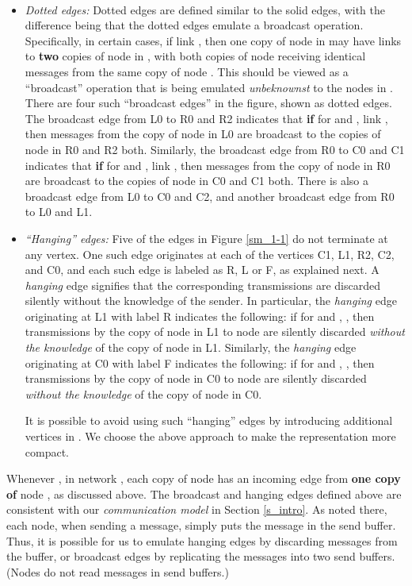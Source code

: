 \documentclass[letterpaper, 11pt]{article}
\newenvironment{proof}{\noindent {\bf Proof:}~}{\hspace*{\fill}}
\begin{document}
\begin{proof}
\begin{itemize}
\item {\em Dotted edges:}
Dotted edges are defined similar to the solid edges, with the difference being that
the dotted edges emulate a broadcast operation. 
Specifically, in certain cases, if link , then one copy of node 
in  may have links to {\bf two} copies of node  in , with both copies
of node  receiving identical messages from the same copy of node . 
This should be viewed as a ``broadcast'' operation that is being
emulated {\em unbeknownst} to the
nodes in .
There are four such ``broadcast edges'' in the figure, shown as
dotted edges.
The broadcast edge from L0 to R0 and R2 indicates that
{\bf if} for  and , link ,
then messages from the copy of node  in L0 are broadcast to the
copies of node  in R0 and R2 both.
Similarly, the broadcast edge from R0 to C0 and C1 indicates that
{\bf if} for  and , link ,
then messages from the copy of node  in R0 are broadcast to the
copies of node  in C0 and C1 both.
There is also a broadcast edge from L0 to C0 and C2,
and another broadcast edge from R0 to L0 and L1. 

\item {\em ``Hanging'' edges:}
Five of the edges in Figure \ref{sm_1-1} do not terminate at any vertex.
One such edge originates at each of the vertices C1, L1, R2, C2, and C0,
and each such edge is labeled as R, L or F, as explained next.
A {\em hanging} edge signifies that the corresponding transmissions are discarded
silently without the knowledge of the sender.
In particular, the {\em hanging} edge originating at L1 with label R indicates the following:
if for  and , , then transmissions by
the copy of node  in L1 to node  are silently discarded {\em without the knowledge} of
the copy of node  in L1.
Similarly, the {\em hanging} edge originating at C0 with label F indicates the following:
if for  and , , then transmissions by
the copy of node  in C0 to node  are silently discarded {\em without the knowledge} of
the copy of node  in C0.

It is possible to avoid using such ``hanging'' edges by introducing additional vertices
in . We choose the above approach to make the representation more compact.

\end{itemize}
Whenever , in network , each copy of node  has
an incoming edge from {\bf one copy of} node , as discussed above.
The broadcast and hanging edges defined above are consistent with our
{\em communication model} in Section \ref{s_intro}. As noted there,
each node, when sending a message, simply puts the message in the send
buffer. Thus, it is possible for us to emulate hanging edges by
discarding messages from the buffer, or broadcast edges by replicating
the messages into two send buffers. (Nodes do not read messages in
send buffers.) 


\end{proof}
\end{document}
